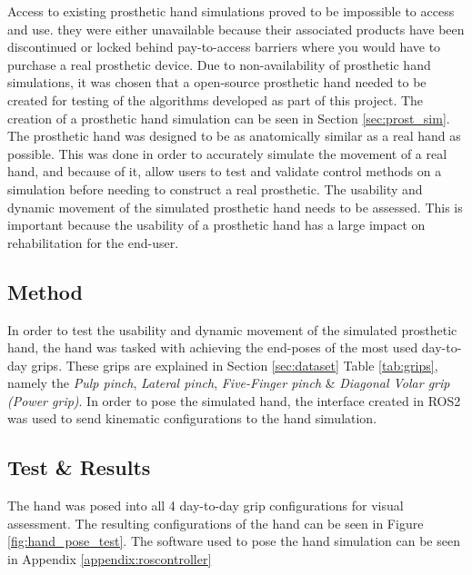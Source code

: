 \documentclass[../main.tex]{subfiles}
\begin{document}
Access to existing prosthetic hand simulations proved to be impossible to access and use.
they were either unavailable because their associated products have been discontinued or locked behind pay-to-access barriers where you would have to purchase a real prosthetic device.
Due to non-availability of prosthetic hand simulations, it was chosen that a open-source prosthetic hand needed to be created for testing of the algorithms developed as part of this project.
The creation of a prosthetic hand simulation can be seen in Section \ref{sec:prost_sim}.
The prosthetic hand was designed to be as anatomically similar as a real hand as possible.
This was done in order to accurately simulate the movement of a real hand, and because of it, allow users to test and validate control methods on a simulation before needing to construct a real prosthetic.
The usability and dynamic movement of the simulated prosthetic hand needs to be assessed.
This is important because the usability of a prosthetic hand has a large impact on rehabilitation for the end-user.

\subsection{Method}

In order to test the usability and dynamic movement of the simulated prosthetic hand, the hand was tasked with achieving the end-poses of the most used day-to-day grips.
These grips are explained in Section \ref{sec:dataset} Table \ref{tab:grips}, namely the \textit{Pulp pinch}, \textit{Lateral pinch}, \textit{Five-Finger pinch} \& \textit{Diagonal Volar grip (Power grip)}.
In order to pose the simulated hand, the interface created in ROS2 \cite{ros2} was used to send kinematic configurations to the hand simulation.

\subsection{Test \& Results}

The hand was posed into all 4 day-to-day grip configurations for visual assessment.
The resulting configurations of the hand can be seen in Figure  \ref{fig:hand_pose_test}.
The software used to pose the hand simulation can be seen in Appendix \ref{appendix:roscontroller} 
\end{document}
